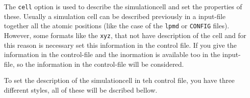 The \verb|cell| option is used to describe the simulationcell and set the
properties of these. Usually a simulation cell can be described previously in a
input-file together all the atomic positions (like the case of the
\texttt{lpmd} or \texttt{CONFIG} files). However, some formats like the
\texttt{xyz}, that not have description of the cell and for this reason is
necessary set this information in the control file. If you give the information
in the control-file and the inormation is available too in the input-file, so
the information in the control-file will be considered.


To set the description of the simulationcell in teh control file, you have
three different styles, all of these will be dscribed bellow.


